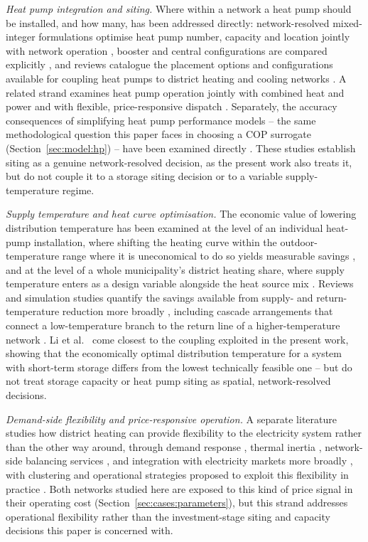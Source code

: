 \documentclass[review,3p]{elsarticle}
\begin{document}
\emph{Heat pump integration and siting.} Where within a network a heat
pump should be installed, and how many, has been addressed directly:
network-resolved mixed-integer formulations optimise heat pump number,
capacity and location jointly with network operation
\cite{Hering.2021,Hering.2022,Capone.2023}, booster and central
configurations are compared explicitly \cite{Ostergaard.2016}, and
reviews catalogue the placement options and configurations available
for coupling heat pumps to district heating and cooling networks
\cite{BarcoBurgos.2022,Schlosser.2020,Jesper.2021}. A related strand
examines heat pump operation jointly with combined heat and power
\cite{Levihn.2017} and with flexible, price-responsive dispatch
\cite{Rahlf.2026,Abokersh.2020}. Separately, the accuracy consequences
of simplifying heat pump performance models -- the same methodological
question this paper faces in choosing a COP surrogate
(Section~\ref{sec:model:hp}) -- have been examined directly
\cite{Zaubitzer.2026,Kuosa.2024}. These studies establish
siting as a genuine network-resolved decision, as the present work also
treats it, but do not couple it to a storage siting decision or to a
variable supply-temperature regime.

\emph{Supply temperature and heat curve optimisation.} The economic
value of lowering distribution temperature has been examined at the
level of an individual heat-pump installation, where shifting the
heating curve within the outdoor-temperature range where it is
uneconomical to do so yields measurable savings \cite{Krug.2025}, and at
the level of a whole municipality's district heating share, where supply
temperature enters as a design variable alongside the heat source mix
\cite{Trentmann.2026}. Reviews and simulation studies quantify the
savings available from supply- and return-temperature reduction more
broadly \cite{Guelpa.2023,Wang.2024,Buonomano.2024}, including cascade
arrangements that connect a low-temperature branch to the return line of
a higher-temperature network \cite{Volkova.2020}. Li et al.\
\cite{Li.2022} come closest to the coupling exploited in the present
work, showing that the economically optimal distribution temperature
for a system with short-term storage differs from the lowest
technically feasible one -- but do not treat storage capacity or heat
pump siting as spatial, network-resolved decisions.

\emph{Demand-side flexibility and price-responsive operation.} A
separate literature studies how district heating can provide flexibility
to the electricity system rather than the other way around, through
demand response \cite{Guelpa.2021,Ju.2023}, thermal inertia
\cite{Guelpa.2022}, network-side balancing services
\cite{Boldrini.2022}, and integration with electricity markets more
broadly \cite{Golmohamadi.2022,Javanshir.2023}, with clustering and
operational strategies proposed to exploit this flexibility in practice
\cite{Guelpa.2018,Guelpa.2020}. Both networks studied here are exposed to
this kind of price signal in their operating cost
(Section~\ref{sec:cases:parameters}), but this strand addresses
operational flexibility rather than the investment-stage siting and
capacity decisions this paper is concerned with.
\end{document}
